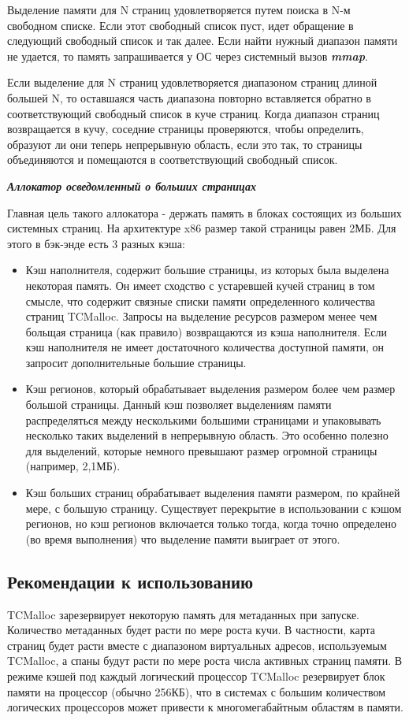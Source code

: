 Выделение памяти для N страниц удовлетворяется путем поиска в N-м свободном списке. Если этот свободный список пуст, идет обращение в следующий свободный список и так далее. Если найти нужный диапазон памяти не удается, то память запрашивается у ОС через системный вызов \textbf{\textit{mmap}}.

Если выделение для N страниц удовлетворяется диапазоном страниц длиной большей N, то оставшаяся часть диапазона повторно вставляется обратно в соответствующий свободный список в куче страниц. Когда диапазон страниц возвращается в кучу, соседние страницы проверяются, чтобы определить, образуют ли они теперь непрерывную область, если это так, то страницы объединяются и помещаются в соответствующий свободный список.

\bigbreak
\textit{\textbf{Аллокатор осведомленный о больших страницах}}

Главная цель такого аллокатора - держать память в блоках состоящих из больших системных страниц. На архитектуре x86 размер такой страницы равен 2МБ. Для этого в бэк-энде есть 3 разных кэша:
\begin{itemize}
	\item Кэш наполнителя, содержит большие страницы, из которых была выделена некоторая память. Он имеет сходство с устаревшей кучей страниц в том смысле, что содержит связные списки памяти определенного количества страниц TCMalloc. Запросы на выделение ресурсов размером менее чем больщая страница (как правило) возвращаются из кэша наполнителя. Если кэш наполнителя не имеет достаточного количества доступной памяти, он запросит дополнительные большие страницы.
	\item Кэш регионов, который обрабатывает выделения размером более чем размер большой страницы. Данный кэш позволяет выделениям памяти распределяться между несколькими большими страницами и упаковывать несколько таких выделений в непрерывную область. Это особенно полезно для выделений, которые немного превышают размер огромной страницы (например, 2,1МБ).
	\item Кэш больших страниц обрабатывает выделения памяти размером, по крайней мере, с большую страницу. Существует перекрытие в использовании с кэшом регионов, но кэш регионов включается только тогда, когда точно определено (во время выполнения) что выделение памяти выиграет от этого.
\end{itemize}

\subsection{Рекомендации к использованию}
TCMalloc зарезервирует некоторую память для метаданных при запуске. Количество метаданных будет расти по мере роста кучи. В частности, карта страниц будет расти вместе с диапазоном виртуальных адресов, используемым TCMalloc, а спаны будут расти по мере роста числа активных страниц памяти. В режиме кэшей под каждый логический процессор TCMalloc резервирует блок памяти на процессор (обычно 256КБ), что в системах с большим количеством логических процессоров может привести к многомегабайтным областям в памяти.

